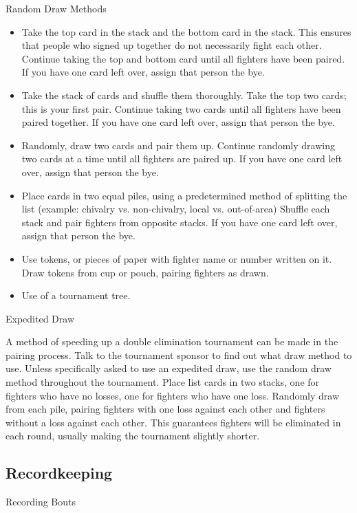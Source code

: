 \documentclass{article}
\begin{document}
Random Draw Methods
\begin{itemize}
\item Take the top card in the stack and the bottom card in the stack. This ensures that people who signed up
together do not necessarily fight each other. Continue taking the top and bottom card until all fighters
have been paired. If you have one card left over, assign that person the bye.

\item Take the stack of cards and shuffle them thoroughly. Take the top two cards; this is your first pair.
Continue taking two cards until all fighters have been paired together. If you have one card left over,
assign that person the bye.

\item Randomly, draw two cards and pair them up. Continue randomly drawing two cards at a time until all
fighters are paired up. If you have one card left over, assign that person the bye.

\item Place cards in two equal piles, using a predetermined method of splitting the list (example: chivalry vs.
non-chivalry, local vs. out-of-area) Shuffle each stack and pair fighters from opposite stacks. If you
have one card left over, assign that person the bye.

\item Use tokens, or pieces of paper with fighter name or number written on it. Draw tokens from cup or
pouch, pairing fighters as drawn.

\item Use of a tournament tree.
\end{itemize}

Expedited Draw

A method of speeding up a double elimination tournament can be made in the pairing process. Talk to the
tournament sponsor to find out what draw method to use. Unless specifically asked to use an expedited
draw, use the random draw method throughout the tournament.
Place list cards in two stacks, one for fighters who have no losses, one for fighters who have one loss.
Randomly draw from each pile, pairing fighters with one loss against each other and fighters without a
loss against each other. This guarantees fighters will be eliminated in each round, usually making the
tournament slightly shorter.


\subsection{Recordkeeping}
Recording Bouts
\end{document}
